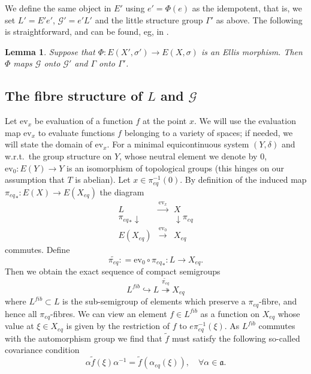 \documentclass[12pt]{amsart}
\newtheorem{lemma}[theorem]{Lemma}
\theoremstyle{definition}
\numberwithin{equation}{section}
\newcommand{\Gg}{{\mathcal G}}
\newcommand{\Xe}{X_{eq}}
\newcommand{\aut}{{\mathfrak a}}
\newcommand{\pe}{\pi_{eq}}
\newcommand{\tpe}{\widetilde{\pe}}
\newcommand{\ev}{\mathrm{ev}}
\newcommand{\peq}{\pi_{eq}}
\begin{document}
We define the same object in $E'$ using $e'=\Phi(e)$ as the idempotent, that is, we set $L'=E'e'$, $\Gg' = e'L'$ and the little structure group $\Gamma'$ as above. The following is straightforward, and can be found, eg, in \cite[Lemma 24]{BKY}.  
\begin{lemma}
Suppose  that $\Phi:E(X',\sigma')\rightarrow E(X,\sigma)$ is an Ellis morphism. Then 
$\Phi$ maps  $\Gg$ onto $\Gg'$ and $\Gamma$ onto $\Gamma'$.
\end{lemma}


\subsection{The fibre structure of $L$ and $\Gg$}\label{sec-2.4}

Let $\ev_x$ be evaluation of a function $f$ at the point $x$. We will use  the evaluation  map $\ev_x$ to evaluate  functions $f$  belonging to a variety of spaces; if needed, we will state the domain of $\ev_x$.
For a minimal equicontinuous system  $(Y,\delta)$ and w.r.t.\ the group structure on $Y$, whose neutral element we denote by $0$,
$\ev_{0} : E(Y) \to Y$ is an isomorphism of topological groups  \cite[Chap.~3, Theorem~6]{Auslander1988} (this hinges on our assumption that $T$ is abelian).
Let $x\in\pe^{-1}(0)$. By definition of the induced map ${\pe}_*:E(X)\to E(\Xe)$ the diagram
\begin{equation}\label{eq-commuting1}
\begin{matrix}
L & \stackrel{\ev_x}\to & X \\
{\pe}_* \downarrow & & \downarrow \pe \\
E(\Xe)  &\stackrel{\ev_0} \to & \Xe 
\end{matrix}
\end{equation}
commutes. Define
$$\tpe : = \ev_0\circ {\pe}_*:L\to \Xe.$$
Then we obtain the exact sequence of compact semigroups
$$L^{fib} \hookrightarrow L \stackrel{\tpe}\twoheadrightarrow \Xe$$
where $L^{fib}\subset L$ is the sub-semigroup of elements  
which preserve a $\peq$-fibre, and hence all $\peq$-fibres.
We can view an element $f\in L^{fib}$ as a function on $\Xe$ 
whose value at $\xi\in \Xe$ is given by the restriction of $f$ to  $e\pe^{-1}(\xi)$. As $L^{fib}$ commutes with the automorphism group we find that $\tilde f$ must satisfy the following so-called covariance condition
\begin{equation}\label{eq-cov-0}
\alpha \tilde f(\xi) \alpha^{-1} = \tilde f(\alpha_{eq}(\xi)),\quad \forall \alpha\in \aut.
\end{equation}
\end{document}
